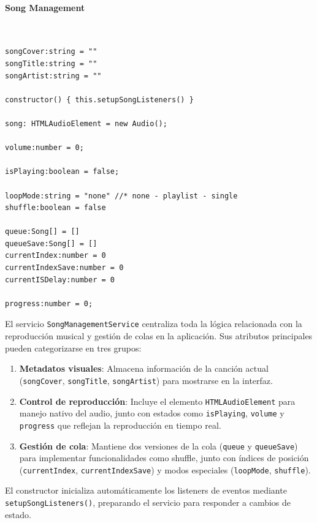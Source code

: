 \documentclass[11pt, a4paper]{article}
\begin{document}
                \paragraph{Song Management}
                ‎

                \begin{lstlisting}[caption={Atributos Song Management}]
songCover:string = ""
songTitle:string = ""
songArtist:string = ""

constructor() { this.setupSongListeners() }

song: HTMLAudioElement = new Audio();

volume:number = 0;

isPlaying:boolean = false;

loopMode:string = "none" //* none - playlist - single
shuffle:boolean = false

queue:Song[] = []
queueSave:Song[] = []
currentIndex:number = 0
currentIndexSave:number = 0
currentISDelay:number = 0

progress:number = 0;
                \end{lstlisting}

                El servicio \texttt{SongManagementService} centraliza toda la lógica relacionada con la reproducción musical y gestión de colas en la aplicación. Sus atributos principales pueden categorizarse en tres grupos:

                \begin{enumerate}
                    \item \textbf{Metadatos visuales}: Almacena información de la canción actual (\texttt{songCover}, \texttt{songTitle}, \texttt{songArtist}) para mostrarse en la interfaz.
                    \item \textbf{Control de reproducción}: Incluye el elemento \texttt{HTMLAudioElement} para manejo nativo del audio, junto con estados como \texttt{isPlaying}, \texttt{volume} y \texttt{progress} que reflejan la reproducción en tiempo real.
                    \item \textbf{Gestión de cola}: Mantiene dos versiones de la cola (\texttt{queue} y \texttt{queueSave}) para implementar funcionalidades como shuffle, junto con índices de posición (\texttt{currentIndex}, \texttt{currentIndexSave}) y modos especiales (\texttt{loopMode}, \texttt{shuffle}).
                \end{enumerate}

                El constructor inicializa automáticamente los listeners de eventos mediante \texttt{setupSongListeners()}, preparando el servicio para responder a cambios de estado.
\end{document}
